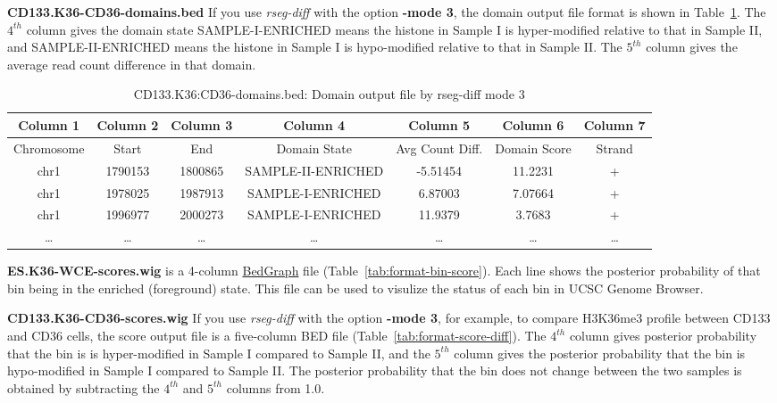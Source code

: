 \documentclass[11pt]{report}
\begin{document}
\textbf{CD133.K36-CD36-domains.bed} If you use \textit{rseg-diff} with
the option \textbf{-mode 3}, the domain output file format is shown in
Table~\ref{tab:format-domain-diff}. The $4^{th}$ column gives the
domain state SAMPLE-I-ENRICHED means the histone in Sample I is
hyper-modified relative to that in Sample II, and SAMPLE-II-ENRICHED
means the histone in Sample I is hypo-modified relative to that in
Sample II.  The $5^{th}$ column gives the average read count
difference in that domain.

\begin{table}[th]
  \centering
  \begin{tabular}{c c c c c c c}
Column 1 & Column 2 & Column 3 &  Column 4 & Column 5 &  Column 6  &
Column 7 \\
\hline
Chromosome  & Start & End & Domain State &  Avg Count Diff.& Domain Score &  Strand \\
\hline
chr1&    1790153& 1800865& SAMPLE-II-ENRICHED &     -5.51454   &     11.2231& + \\
chr1&    1978025& 1987913& SAMPLE-I-ENRICHED &      6.87003& 7.07664& + \\
chr1&    1996977& 2000273& SAMPLE-I-ENRICHED &      11.9379 &3.7683 & + \\
\ldots & \ldots &\ldots &\ldots &\ldots &\ldots & \ldots\\ 
\hline
  \end{tabular}
  \caption{CD133.K36:CD36-domains.bed: Domain output file  by rseg-diff mode 3}
  \label{tab:format-domain-diff}
\end{table}


\textbf{ES.K36-WCE-scores.wig} is a 4-column
\href{http://genome.ucsc.edu/goldenPath/help/bedgraph.html}{BedGraph}
file (Table~\ref{tab:format-bin-score}). Each line shows the posterior
probability of that bin being in the enriched (foreground) state. This
file can be used to visulize the status of each bin in UCSC Genome
Browser.

\textbf{CD133.K36-CD36-scores.wig} If you use \textit{rseg-diff} with
the option \textbf{-mode 3}, for example, to compare H3K36me3 profile
between CD133 and CD36 cells, the score output file is a five-column
BED file (Table~\ref{tab:format-score-diff}). The $4^{th}$ column
gives posterior probability that the bin is is hyper-modified in
Sample I compared to Sample II, and the $5^{th}$ column gives the
posterior probability that the bin is hypo-modified in Sample I
compared to Sample II. The posterior probability that the bin does not
change between the two samples is obtained by subtracting the $4^{th}$
and $5^{th}$ columns from 1.0.
\end{document}
